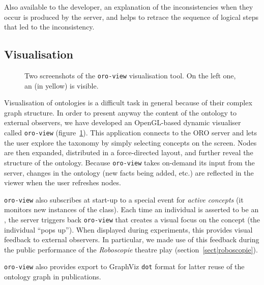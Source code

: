 Also available to the developer, an explanation of the inconsistencies when
they occur is produced by the server, and helps to retrace the sequence of
logical steps that led to the inconsistency.

\subsection{Visualisation}
\label{sect|oroview}

\begin{figure}
    \centering

    \caption{Two screenshots of the {\tt oro-view} visualisation tool. On the
    left one, an  (in yellow) is visible.}

    \label{fig|oroview}
\end{figure}

Visualisation of ontologies is a difficult task in general because of their
complex graph structure. In order to present anyway the content of the ontology
to external observers, we have developed an OpenGL-based dynamic visualiser
called {\tt oro-view} (figure~\ref{fig|oroview}). This application connects to
the ORO server and lets the user explore the taxonomy by simply selecting
concepts on the screen. Nodes are then expanded, distributed in a force-directed
layout, and further reveal the structure of the ontology. Because {\tt oro-view}
takes on-demand its input from the server, changes in the ontology (new facts
being added, etc.) are reflected in the viewer when the user refreshes nodes.

{\tt oro-view} also subscribes at start-up to a special event for \emph{active
concepts} (it monitors new instances of the  class).
Each time an individual is asserted to be an , the
server triggers back {\tt oro-view} that creates a visual focus on the concept
(the individual ``pops up''). When displayed during experiments, this provides
visual feedback to external observers. In particular, we made use
of this feedback during the public performance of the \emph{Roboscopie} theatre
play (section~\ref{sect|roboscopie}).

{\tt oro-view} also provides export to GraphViz {\tt dot} format for latter
reuse of the ontology graph in publications.

